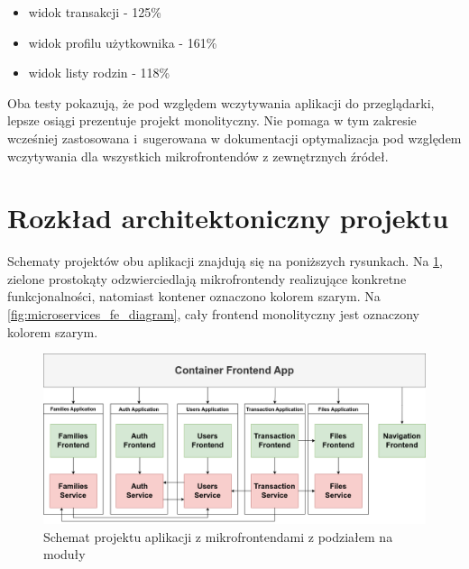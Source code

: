 \documentclass{SGGW-thesis}
\begin{document}
    \begin{itemize}
      \item widok transakcji - 125\%
      \item widok profilu użytkownika - 161\%
      \item widok listy rodzin - 118\%
    \end{itemize}

    Oba testy pokazują, że pod względem wczytywania aplikacji do przeglądarki, lepsze osiągi prezentuje projekt monolityczny. Nie pomaga w tym zakresie wcześniej zastosowana i~sugerowana w dokumentacji \cite{singlespa} optymalizacja pod względem wczytywania dla wszystkich mikrofrontendów z zewnętrznych źródeł.

  \section{Rozkład architektoniczny projektu}
  Schematy projektów obu aplikacji znajdują się na poniższych rysunkach. Na \cref{fig:monolith_fe_diagram}, zielone prostokąty odzwierciedlają mikrofrontendy realizujące konkretne funkcjonalności, natomiast kontener oznaczono kolorem szarym. Na \cref{fig:microservices_fe_diagram}, cały frontend monolityczny jest oznaczony kolorem szarym.

  \begin{figure}[h!]
    \centering
    \captionsetup{justification=centering}
    \includegraphics[width=\textwidth]{microfrontend-app-architecture.png}
    \caption{Schemat projektu aplikacji z mikrofrontendami z podziałem na moduły}
    \label{fig:monolith_fe_diagram}
  \end{figure}

  \pagebreak
\end{document}
